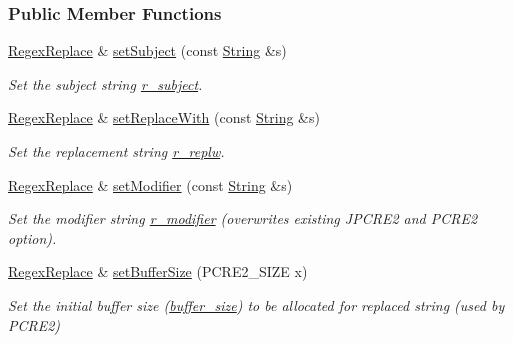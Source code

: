 \subsubsection*{Public Member Functions}
\begin{DoxyCompactItemize}
\item 
\hyperlink{classjpcre2_1_1RegexReplace}{Regex\+Replace} \& \hyperlink{classjpcre2_1_1RegexReplace_a46eefdb105827920bebc8436721fa4cb}{set\+Subject} (const \hyperlink{namespacejpcre2_a91f03070152fb228bc116c5a737f1d16}{String} \&s)
\begin{DoxyCompactList}\small\item\em Set the subject string \hyperlink{classjpcre2_1_1RegexReplace_a2290e5d9f1c2336abd431fef97e72c93}{r\+\_\+subject}. \end{DoxyCompactList}\item 
\hyperlink{classjpcre2_1_1RegexReplace}{Regex\+Replace} \& \hyperlink{classjpcre2_1_1RegexReplace_af1069f489de9b343493da2dc77b04c73}{set\+Replace\+With} (const \hyperlink{namespacejpcre2_a91f03070152fb228bc116c5a737f1d16}{String} \&s)
\begin{DoxyCompactList}\small\item\em Set the replacement string \hyperlink{classjpcre2_1_1RegexReplace_a73d0da1aac8b83a0a47b24629b5013f4}{r\+\_\+replw}. \end{DoxyCompactList}\item 
\hyperlink{classjpcre2_1_1RegexReplace}{Regex\+Replace} \& \hyperlink{classjpcre2_1_1RegexReplace_ae2abe2994b0fbe54950f88e63000c910}{set\+Modifier} (const \hyperlink{namespacejpcre2_a91f03070152fb228bc116c5a737f1d16}{String} \&s)
\begin{DoxyCompactList}\small\item\em Set the modifier string \hyperlink{classjpcre2_1_1RegexReplace_a3e6b848c7ad8f53cc17f49a6038930ec}{r\+\_\+modifier} (overwrites existing J\+P\+C\+R\+E2 and P\+C\+R\+E2 option). \end{DoxyCompactList}\item 
\hyperlink{classjpcre2_1_1RegexReplace}{Regex\+Replace} \& \hyperlink{classjpcre2_1_1RegexReplace_a452dd2632031a13b39c13b792f18a491}{set\+Buffer\+Size} (P\+C\+R\+E2\+\_\+\+S\+I\+ZE x)
\begin{DoxyCompactList}\small\item\em Set the initial buffer size (\hyperlink{classjpcre2_1_1RegexReplace_a44abce541819ceb51e342411b48e95cb}{buffer\+\_\+size}) to be allocated for replaced string (used by P\+C\+R\+E2) \end{DoxyCompactList}\item 

\end{DoxyCompactItemize}
